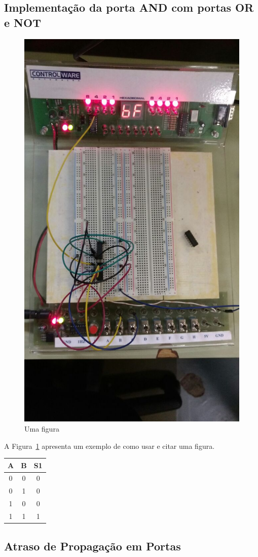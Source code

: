\documentclass[12pt]{article}
\begin{document}
\subsection{Implementação da porta AND com portas OR e NOT}
\label{sec:NOTOR}

\begin{figure}[H]
\centering
\includegraphics[width=.5\textwidth]{Porta_AND.jpeg}
\caption{Uma figura}
\label{fig:portaand}
\end{figure}

A Figura~\ref{fig:portaand} apresenta um exemplo de como usar e citar uma figura.

\begin{table}
	\centering
	\begin{tabular}{|c|c|c|}
	\cline{1-3}
	\multicolumn{1}{|c|}{A} & \multicolumn{1}{|c|}{B} & \multicolumn{1}{|c|}{S1}\\
	\hline
	0 & 0 & 0\\
	0 & 1 & 0\\
	1 & 0 & 0\\
	1 & 1 & 1\\
	\hline
	\end{tabular}
	\label{ORNOTAND}
\end{table}

\subsection{Atraso de Propagação em Portas}
\label{sec:atraso}
\end{document}
